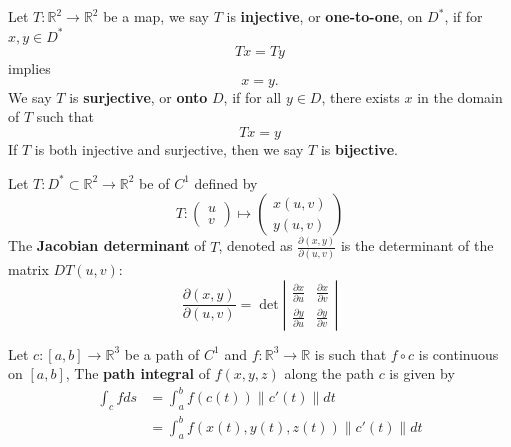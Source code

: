 \documentclass[openany]{book}
\newcommand{\R}{\mathbb{R}}
\begin{document}
\begin{defn}
    Let $T:\R^2\to\R^2$ be a map, we say $T$ is \textbf{injective}, or \textbf{one-to-one}, on $D^*$, if for $x,y\in D^*$
    \begin{equation*}
        Tx=Ty
    \end{equation*}
    implies
    \begin{equation*}
        x=y.
    \end{equation*}
    We say $T$ is \textbf{surjective}, or \textbf{onto} $D$, if for all $y\in D$, there exists $x$ in the domain of $T$ such that 
    \begin{equation*}
        Tx=y
    \end{equation*}
    If $T$ is both injective and surjective, then we say $T$ is \textbf{bijective}.
\end{defn}


\begin{defn}
    Let $T:D^*\subset\R^2\to\R^2$ be of $C^1$ defined by 
    \begin{equation*}
        T:\begin{pmatrix}
            u\\
            v
        \end{pmatrix}\mapsto \begin{pmatrix}
            x(u,v)\\
            y(u,v)
        \end{pmatrix}
    \end{equation*}
    The \textbf{Jacobian determinant} of $T$, denoted as $\frac{\partial(x,y)}{\partial(u,v)}$ is the determinant of the matrix $DT(u,v)$:
    \begin{equation*}
        \frac{\partial(x,y)}{\partial(u,v)}=\det\left|\begin{matrix}
            \frac{\partial x}{\partial u}& \frac{\partial x}{\partial v}\\
            \frac{\partial y}{\partial u}&\frac{\partial y}{\partial v}
        \end{matrix}\right|
    \end{equation*}
\end{defn}




\begin{defn}
    Let $c:[a,b]\to\R^3$ be a path of $C^1$ and $f:\R^3\to\R$ is such that $f\circ c$ is continuous on $[a,b]$, The \textbf{path integral} of $f(x,y,z)$ along the path $c$ is given by 
    \begin{align*}
        \int_c fds&=\int_a^bf(c(t))\|c'(t)\|dt\\
        &=\int_a^bf(x(t),y(t), z(t))\|c'(t)\|dt
    \end{align*}
\end{defn}
\end{document}
